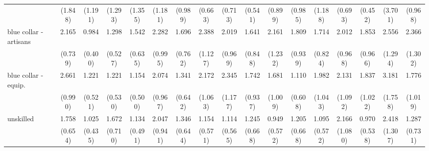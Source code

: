 {\begin{tabular}{l*{16}{c}}
                    &     (1.848)         &     (1.191)         &     (1.293)         &     (1.355)         &     (1.181)         &     (0.989)         &     (0.663)         &     (0.713)         &     (0.541)         &     (0.899)         &     (0.985)         &     (1.188)         &     (0.693)         &     (0.452)         &     (3.701)         &     (0.968)         \\
[1em]
blue collar - artisans&       2.165\sym{*}  &       0.984         &       1.298         &       1.542         &       2.282         &       1.696         &       2.388         &       2.019         &       1.641         &       2.161         &       1.809         &       1.714         &       2.012         &       1.853         &       2.556         &       2.366         \\
                    &     (0.739)         &     (0.400)         &     (0.527)         &     (0.635)         &     (0.995)         &     (0.762)         &     (1.127)         &     (0.969)         &     (0.848)         &     (1.232)         &     (0.939)         &     (0.824)         &     (0.968)         &     (0.966)         &     (1.294)         &     (1.302)         \\
[1em]
blue collar - equip.&       2.661\sym{**} &       1.221         &       1.221         &       1.154         &       2.074         &       1.341         &       2.172         &       2.345         &       1.742         &       1.681         &       1.110         &       1.982         &       2.131         &       1.837         &       3.181\sym{*}  &       1.776         \\
                    &     (0.990)         &     (0.521)         &     (0.530)         &     (0.500)         &     (0.967)         &     (0.642)         &     (1.063)         &     (1.177)         &     (0.937)         &     (1.009)         &     (0.608)         &     (1.043)         &     (1.092)         &     (1.022)         &     (1.758)         &     (1.019)         \\
[1em]
unskilled           &       1.758         &       1.025         &       1.672         &       1.134         &       2.047         &       1.346         &       1.154         &       1.114         &       1.245         &       0.949         &       1.205         &       1.095         &       2.166         &       0.970         &       2.418         &       1.287         \\
                    &     (0.654)         &     (0.435)         &     (0.710)         &     (0.491)         &     (0.941)         &     (0.644)         &     (0.571)         &     (0.565)         &     (0.668)         &     (0.572)         &     (0.668)         &     (0.572)         &     (1.080)         &     (0.538)         &     (1.307)         &     (0.731)         \\

\end{tabular}}
